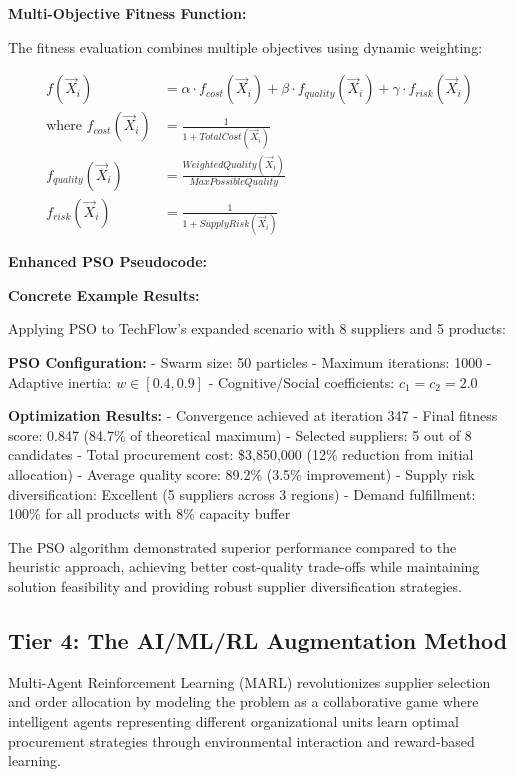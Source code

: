 \documentclass{article}
\begin{document}
\textbf{Multi-Objective Fitness Function:}

The fitness evaluation combines multiple objectives using dynamic weighting:

\begin{align}
f(\vec{X}_i) &= \alpha \cdot f_{cost}(\vec{X}_i) + \beta \cdot f_{quality}(\vec{X}_i) + \gamma \cdot f_{risk}(\vec{X}_i) \\
\text{where } f_{cost}(\vec{X}_i) &= \frac{1}{1 + TotalCost(\vec{X}_i)} \\
f_{quality}(\vec{X}_i) &= \frac{WeightedQuality(\vec{X}_i)}{MaxPossibleQuality} \\
f_{risk}(\vec{X}_i) &= \frac{1}{1 + SupplyRisk(\vec{X}_i)}
\end{align}

\textbf{Enhanced PSO Pseudocode:}



\textbf{Concrete Example Results:}

Applying PSO to TechFlow's expanded scenario with 8 suppliers and 5 products:

\textbf{PSO Configuration:}
- Swarm size: 50 particles
- Maximum iterations: 1000  
- Adaptive inertia: $w \in [0.4, 0.9]$
- Cognitive/Social coefficients: $c_1 = c_2 = 2.0$

\textbf{Optimization Results:}
- Convergence achieved at iteration 347
- Final fitness score: 0.847 (84.7\% of theoretical maximum)
- Selected suppliers: 5 out of 8 candidates  
- Total procurement cost: \$3,850,000 (12\% reduction from initial allocation)
- Average quality score: 89.2\% (3.5\% improvement)
- Supply risk diversification: Excellent (5 suppliers across 3 regions)
- Demand fulfillment: 100\% for all products with 8\% capacity buffer

The PSO algorithm demonstrated superior performance compared to the heuristic approach, achieving better cost-quality trade-offs while maintaining solution feasibility and providing robust supplier diversification strategies.

\subsection{Tier 4: The AI/ML/RL Augmentation Method}

Multi-Agent Reinforcement Learning (MARL) revolutionizes supplier selection and order allocation by modeling the problem as a collaborative game where intelligent agents representing different organizational units learn optimal procurement strategies through environmental interaction and reward-based learning.
\end{document}
